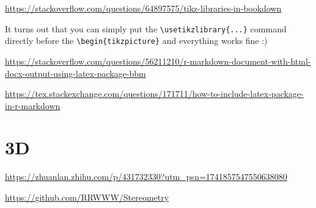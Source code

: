 \documentclass[
]{book}
\theoremstyle{definition}
\theoremstyle{definition}
\theoremstyle{definition}
\theoremstyle{definition}
\theoremstyle{remark}
\begin{document}
\url{https://stackoverflow.com/questions/64897575/tikz-libraries-in-bookdown}

It turns out that you can simply put the \texttt{\textbackslash{}usetikzlibrary\{...\}} command directly before the \texttt{\textbackslash{}begin\{tikzpicture\}} and everything works fine :)

\url{https://stackoverflow.com/questions/56211210/r-markdown-document-with-html-docx-output-using-latex-package-bbm}

\url{https://tex.stackexchange.com/questions/171711/how-to-include-latex-package-in-r-markdown}

\hypertarget{d-1}{%
\section{3D}\label{d-1}}

\url{https://zhuanlan.zhihu.com/p/431732330?utm_psn=1741857547550638080}

\url{https://github.com/RRWWW/Stereometry}
\end{document}
